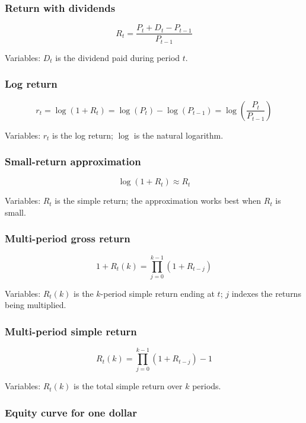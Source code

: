\documentclass[
  8pt,
  twocolumn]{extarticle}
\begin{document}
\subsubsection{Return with dividends}\label{return-with-dividends}

\[
R_t=\frac{P_t+D_t-P_{t-1}}{P_{t-1}}
\]

Variables: \(D_t\) is the dividend paid during period \(t\).

\subsubsection{Log return}\label{log-return}

\[
r_t=\log(1+R_t)=\log(P_t)-\log(P_{t-1})=\log\left(\frac{P_t}{P_{t-1}}\right)
\]

Variables: \(r_t\) is the log return; \(\log\) is the natural logarithm.

\subsubsection{Small-return
approximation}\label{small-return-approximation}

\[
\log(1+R_t)\approx R_t
\]

Variables: \(R_t\) is the simple return; the approximation works best
when \(R_t\) is small.

\subsubsection{Multi-period gross
return}\label{multi-period-gross-return}

\[
1+R_t(k)=\prod_{j=0}^{k-1}(1+R_{t-j})
\]

Variables: \(R_t(k)\) is the \(k\)-period simple return ending at \(t\);
\(j\) indexes the returns being multiplied.

\subsubsection{Multi-period simple
return}\label{multi-period-simple-return}

\[
R_t(k)=\prod_{j=0}^{k-1}(1+R_{t-j})-1
\]

Variables: \(R_t(k)\) is the total simple return over \(k\) periods.

\subsubsection{Equity curve for one
dollar}\label{equity-curve-for-one-dollar}
\end{document}
